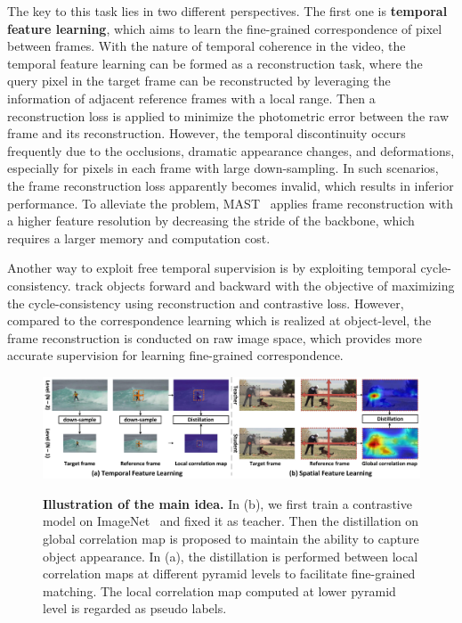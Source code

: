 \documentclass{article}
\begin{document}
The key to this task lies in two different perspectives. The first one is \textbf{temporal feature learning}, which aims to learn the fine-grained correspondence of pixel between frames. With the nature of temporal coherence in the video, the temporal feature learning can be formed as a reconstruction task, where the query pixel in the target frame can be reconstructed by leveraging the information of adjacent reference frames with a local range. Then a reconstruction loss is applied to minimize the photometric error between the raw frame and its reconstruction. However, the temporal discontinuity occurs frequently due to the occlusions, dramatic appearance changes, and deformations, especially for pixels in each frame with large down-sampling. In such scenarios, the frame reconstruction loss apparently becomes invalid, which results in inferior performance. To alleviate the problem, MAST~\cite{lai2020mast} applies frame reconstruction with a higher feature resolution by decreasing the stride of the backbone, which requires a larger memory and computation cost. 

Another way to exploit free temporal supervision is by exploiting temporal cycle-consistency.  \cite{jabri2020space}\cite{wang2019learning} track objects forward and backward with the objective of maximizing the cycle-consistency using  reconstruction and contrastive loss. However, compared to the correspondence learning which is realized at object-level, the frame reconstruction is conducted on raw image space, which provides more accurate supervision for learning fine-grained correspondence.

\begin{figure}[!tb]
  \centering
  {\includegraphics[width=1.0\textwidth]{figure/tissor/tissor.pdf}}
  \caption{\small \textbf{Illustration of the main idea.} In (b), we first train a contrastive model on ImageNet~\cite{deng2009large} and fixed it as teacher. Then the distillation on global correlation map is proposed to maintain the ability to capture object appearance. In (a), the distillation is performed between local correlation maps at different pyramid levels to facilitate fine-grained matching. The local correlation map computed at lower pyramid level is regarded as pseudo labels.}
  \label{fig:tissor}
  \vspace{-6mm}
\end{figure}
\end{document}
